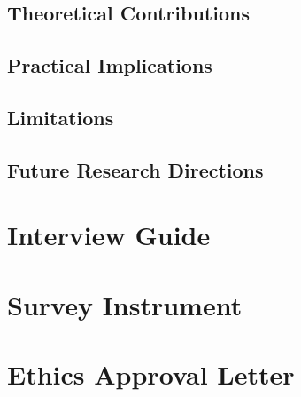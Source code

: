 \documentclass[12pt,a4paper,oneside]{report}
\begin{document}
\section{Theoretical Contributions}
\section{Practical Implications}
\section{Limitations}
\section{Future Research Directions}




\appendix
\chapter{Interview Guide}
\chapter{Survey Instrument}
\chapter{Ethics Approval Letter}
\end{document}

